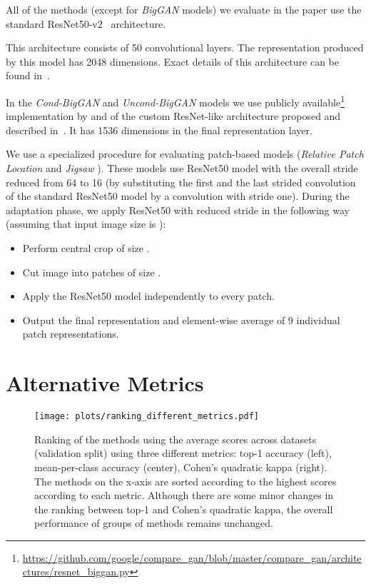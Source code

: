 \documentclass{article}
\begin{document}
All of the methods (except for \emph{BigGAN} models) we evaluate in the paper use the standard ResNet50-v2~\citep{he2016identity} architecture.

This architecture consists of 50 convolutional layers.
The representation produced by this model has 2048 dimensions.
Exact details of this architecture can be found in~\citep{he2016identity}.

In the \emph{Cond-BigGAN} and \emph{Uncond-BigGAN} models we use publicly available\footnote{\url{https://github.com/google/compare_gan/blob/master/compare_gan/architectures/resnet_biggan.py}} implementation by \cite{lucic2019high} and \citep{chen2019self} of the custom ResNet-like architecture proposed and described in~\citep{brock2018large}. It has 1536 dimensions in the final representation layer.

We use a specialized procedure for evaluating patch-based models (\emph{Relative Patch Location} \citep{doersch2015unsupervised} and \emph{Jigsaw} \citep{noroozi2016unsupervised}). These models use ResNet50 model with the overall stride reduced from 64 to 16 (by substituting the first and the last strided convolution of the standard ResNet50 model by a convolution with stride one). During the adaptation phase, we apply ResNet50 with reduced stride in the following way (assuming that input image size is ):
\begin{itemize}
\item Perform central crop of size .
\item Cut image into  patches of size .
\item Apply the ResNet50 model independently to every patch.
\item Output the final representation and element-wise average of 9 individual patch representations.
\end{itemize}

\clearpage
\section{Alternative Metrics\label{app:metrics}}

\begin{figure}[h]
    \centering
    \texttt{[image: plots/ranking\_different\_metrics.pdf]}
    \caption{Ranking of the methods using the average scores across datasets (validation split) using three different metrics:
    top-1 accuracy (left),
    mean-per-class accuracy (center),
    Cohen's quadratic kappa (right).
    The methods on the x-axis are sorted according to the highest scores according to each metric.
    Although there are some minor changes in the ranking between top-1 and Cohen's quadratic kappa, 
    the overall performance of groups of methods remains unchanged.}
    \label{fig:metrics}
\end{figure}
\end{document}
